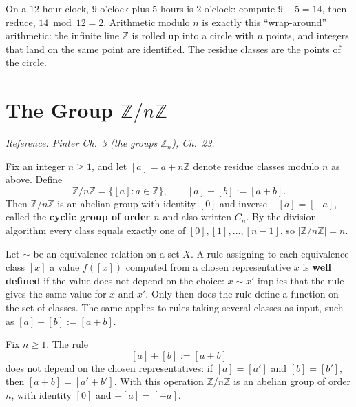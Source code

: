 \documentclass[11pt]{report}
\begin{document}
\begin{rembox}\label{rem:clock-picture}
On a $12$-hour clock, $9$ o'clock plus $5$ hours is $2$ o'clock: compute $9 + 5 = 14$, then reduce, $14 \bmod 12 = 2$. Arithmetic modulo $n$ is exactly this ``wrap-around'' arithmetic: the infinite line $\mathbb{Z}$ is rolled up into a circle with $n$ points, and integers that land on the same point are identified. The residue classes are the points of the circle.
\end{rembox}

\section{\texorpdfstring{The Group $\mathbb{Z}/n\mathbb{Z}$}{The Group ℤ/nℤ}}\label{sec:znz}

\textit{Reference: Pinter Ch.\ 3 (the groups $\mathbb{Z}_n$), Ch.\ 23.}

\begin{defbox}[{The Cyclic Group $\mathbb{Z}/n\mathbb{Z} = C_n$}]\label{def:cyclic-group-z-nz-cn}
Fix an integer $n \geq 1$, and let $[a] = a + n\mathbb{Z}$ denote residue classes modulo $n$ as above. Define
\[ \mathbb{Z}/n\mathbb{Z} = \{[a] : a \in \mathbb{Z}\}, \qquad [a] + [b] := [a + b]. \]
Then $\mathbb{Z}/n\mathbb{Z}$ is an abelian group with identity $[0]$ and inverse $-[a] = [-a]$, called the \textbf{cyclic group of order $n$} and also written $C_n$. By the division algorithm every class equals exactly one of $[0], [1], \ldots, [n-1]$, so $|\mathbb{Z}/n\mathbb{Z}| = n$.
\end{defbox}

\begin{defbox}\label{def:well-defined}
Let $\sim$ be an equivalence relation on a set $X$. A rule assigning to each equivalence class $[x]$ a value $f([x])$ computed from a chosen representative $x$ is \textbf{well defined} if the value does not depend on the choice: $x \sim x'$ implies that the rule gives the same value for $x$ and $x'$. Only then does the rule define a function on the set of classes. The same applies to rules taking several classes as input, such as $[a] + [b] := [a + b]$.
\end{defbox}

\begin{propbox}\label{prop:addition-residue-classes-well-defined-z-nz-group}
Fix $n \geq 1$. The rule
\[ [a] + [b] := [a + b] \]
does not depend on the chosen representatives: if $[a] = [a']$ and $[b] = [b']$, then $[a + b] = [a' + b']$. With this operation $\mathbb{Z}/n\mathbb{Z}$ is an abelian group of order $n$, with identity $[0]$ and $-[a] = [-a]$.
\end{propbox}
\end{document}
